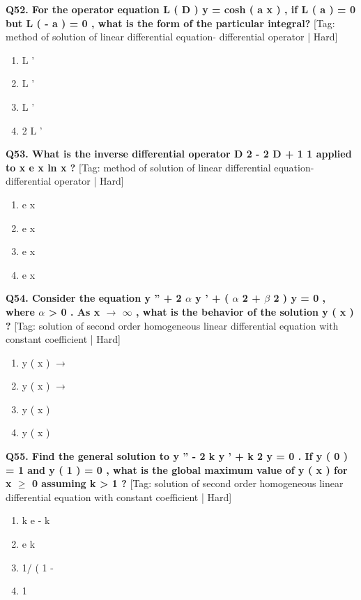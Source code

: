 \noindent\textbf{Q52. For the operator equation L ( D ) y = cosh ( a x ) , if L ( a ) = 0 but L ( - a )  = 0 , what is the form of the particular integral?} \hfill [Tag: method of solution of linear differential equation- differential operator | Hard]
\begin{enumerate}[label=(\alph*),topsep=2pt,itemsep=1pt,partopsep=0pt,parsep=0pt]
    \item {{L '}}
    \item {{L '}}
    \item {{L '}}
    \item {{2 L '}}
\end{enumerate}
\vspace{2mm}

\noindent\textbf{Q53. What is the inverse differential operator D 2 - 2 D + 1 1 applied to x e x ln x ?} \hfill [Tag: method of solution of linear differential equation- differential operator | Hard]
\begin{enumerate}[label=(\alph*),topsep=2pt,itemsep=1pt,partopsep=0pt,parsep=0pt]
    \item {{e x}}
    \item {{e x}}
    \item {{e x}}
    \item {{e x}}
\end{enumerate}
\vspace{2mm}

\noindent\textbf{Q54. Consider the equation y '' + 2 $\alpha$ y ' + ( $\alpha$ 2 + $\beta$ 2 ) y = 0 , where $\alpha$ > 0 . As x $\to$ $\infty$ , what is the behavior of the solution y ( x ) ?} \hfill [Tag: solution of second order homogeneous linear differential equation with constant coefficient | Hard]
\begin{enumerate}[label=(\alph*),topsep=2pt,itemsep=1pt,partopsep=0pt,parsep=0pt]
    \item {{y ( x ) $\to$}}
    \item {{y ( x ) $\to$}}
    \item {{y ( x )}}
    \item {{y ( x )}}
\end{enumerate}
\vspace{2mm}

\noindent\textbf{Q55. Find the general solution to y '' - 2 k y ' + k 2 y = 0 . If y ( 0 ) = 1 and y ( 1 ) = 0 , what is the global maximum value of y ( x ) for x $\ge$ 0 assuming k > 1 ?} \hfill [Tag: solution of second order homogeneous linear differential equation with constant coefficient | Hard]
\begin{enumerate}[label=(\alph*),topsep=2pt,itemsep=1pt,partopsep=0pt,parsep=0pt]
    \item {{k e - k}}
    \item {{e k}}
    \item {{1/ ( 1 -}}
    \item {{1}}
\end{enumerate}
\vspace{2mm}

